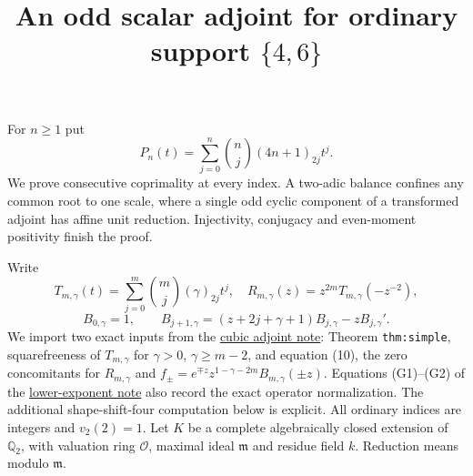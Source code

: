 \documentclass[11pt]{article}
\newcommand{\Q}{\mathbb Q}
\begin{document}
\setlength{\emergencystretch}{1em}
\title{An odd scalar adjoint for ordinary support $\{4,6\}$}
\author{}\date{}\maketitle
For $n\ge1$ put
\[
 P_n(t)=\sum_{j=0}^n\binom nj(4n+1)_{2j}t^j.
\]
We prove consecutive coprimality at every index. A two-adic balance
confines any common root to one scale, where a single odd cyclic
component of a transformed adjoint has affine unit reduction.
Injectivity, conjugacy and even-moment positivity finish the proof.

Write
\[
 T_{m,\gamma}(t)=\sum_{j=0}^m\binom mj(\gamma)_{2j}t^j,\quad
 R_{m,\gamma}(z)=z^{2m}T_{m,\gamma}(-z^{-2}),
\]
\[
 B_{0,\gamma}=1,\qquad
 B_{j+1,\gamma}=(z+2j+\gamma+1)B_{j,\gamma}-zB_{j,\gamma}'.
\]
We import two exact inputs from the
\href{CUBIC_ADJOINT_STABILITY_SFC.tex}{cubic adjoint note}:
Theorem \texttt{thm:simple}, squarefreeness of $T_{m,\gamma}$ for
$\gamma>0$, $\gamma\ge m-2$, and equation (10), the zero concomitants
for $R_{m,\gamma}$ and
$f_\pm=e^{\mp z}z^{1-\gamma-2m}B_{m,\gamma}(\pm z)$.
Equations (G1)--(G2) of the
\href{lower_exponent_initial_and_boundary.tex}{lower-exponent note}
also record the exact operator normalization.
The additional shape-shift-four computation below is explicit.
All ordinary indices are integers and $v_2(2)=1$.
Let $K$ be a complete algebraically closed extension of $\Q_2$,
with valuation ring $\mathcal O$, maximal ideal $\mathfrak m$ and
residue field $k$. Reduction means modulo $\mathfrak m$.
\end{document}
